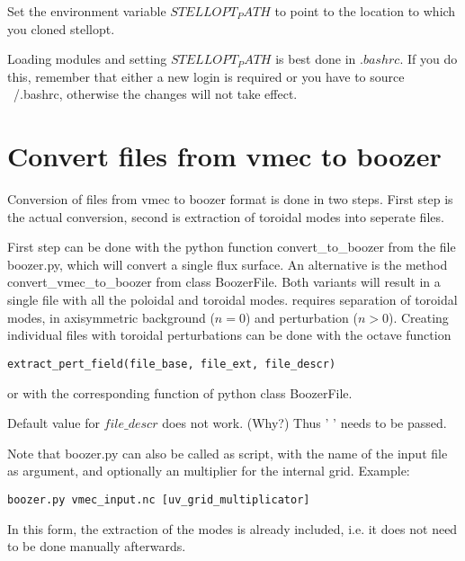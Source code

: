 \documentclass{article}
\begin{document}
Set the environment variable $STELLOPT_PATH$ to point to the location to
which you cloned stellopt.

Loading modules and setting $STELLOPT_PATH$ is best done in $.bashrc$.
If you do this, remember that either a new login is required or you have
to source ~/.bashrc, otherwise the changes will not take effect.


\section{Convert files from vmec to boozer}
Conversion of files from vmec to boozer format is done in two steps.
First step is the actual conversion, second is extraction of toroidal
modes into seperate files.

First step can be done with the python function convert\_to\_boozer
from the file boozer.py, which will convert a single flux surface.
An alternative is the method convert\_vmec\_to\_boozer from class
BoozerFile.
Both variants will result in a single file with all the poloidal and toroidal
modes. \neotwo requires separation of toroidal modes, in axisymmetric
background ($n = 0$) and perturbation ($n > 0$).
Creating individual files  with toroidal perturbations can be done with
the octave function
\begin{verbatim}
extract_pert_field(file_base, file_ext, file_descr)
\end{verbatim}
or with the corresponding function of python class BoozerFile.

Default value for $file\_descr$ does not work. (Why?) Thus ' ' needs to
be passed.

Note that boozer.py can also be called as script, with the name of the
input file as argument, and optionally an multiplier for the internal
grid. Example:
\begin{verbatim}
boozer.py vmec_input.nc [uv_grid_multiplicator]
\end{verbatim}
In this form, the extraction of the modes is already included, i.e. it
does not need to be done manually afterwards.
\end{document}
